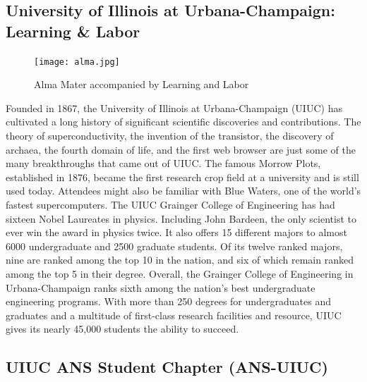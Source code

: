 \subsection{University of Illinois at Urbana-Champaign: Learning \& Labor}
\begin{figure}
  \begin{center}
  \vspace{-\baselineskip}
    \texttt{[image: alma.jpg]}
    \caption{Alma Mater accompanied by Learning and Labor}
  \end{center}
\end{figure}
Founded in 1867, the University of Illinois at Urbana-Champaign (UIUC) has cultivated a long history of significant scientific discoveries and contributions. The theory of superconductivity, the invention of the transistor, the discovery of archaea, the fourth domain of life, and the first web browser are just some of the many breakthroughs that came out of UIUC. The famous Morrow Plots, established in 1876, became the first research crop field at a university and is still used today. Attendees might also be familiar with Blue Waters, one of the world’s fastest supercomputers. 
The UIUC Grainger College of Engineering has had sixteen Nobel Laureates in physics. Including John Bardeen, the only scientist to ever win the award in physics twice. It also offers 15 different majors to almost 6000 undergraduate and 2500 graduate students. Of its twelve ranked majors, nine are ranked among the top 10 in the nation, and six of which remain ranked among the top 5 in their degree. Overall, the Grainger College of Engineering in Urbana-Champaign ranks sixth among the nation’s best undergraduate engineering programs. With more than 250 degrees for undergraduates and graduates and a multitude of first-class research facilities and resource, UIUC gives its nearly 45,000 students the ability to succeed. 

\subsection{UIUC ANS Student Chapter (ANS-UIUC)}

